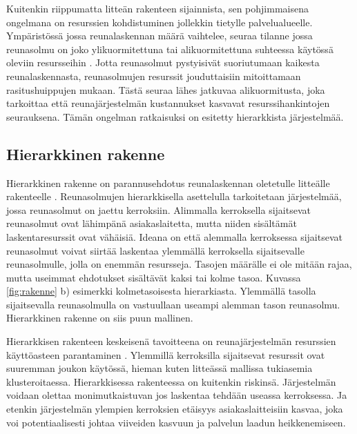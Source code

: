 Kuitenkin riippumatta litteän rakenteen sijainnista, sen pohjimmaisena ongelmana on resurssien kohdistuminen jollekkin tietylle palvelualueelle. Ympäristössä jossa reunalaskennan määrä vaihtelee, seuraa tilanne jossa reunasolmu on joko ylikuormitettuna tai alikuormitettuna suhteessa käytössä oleviin resursseihin \cite{tong2016hierarchical}. Jotta reunasolmut pystyisivät suoriutumaan kaikesta reunalaskennasta, reunasolmujen resurssit jouduttaisiin mitoittamaan rasitushuippujen mukaan. Tästä seuraa lähes jatkuvaa alikuormitusta, joka tarkoittaa että reunajärjestelmän kustannukset kasvavat resurssihankintojen seurauksena. 
Tämän ongelman ratkaisuksi on esitetty hierarkkista järjestelmää.




\subsection{Hierarkkinen rakenne}
Hierarkkinen rakenne on parannusehdotus reunalaskennan oletetulle litteälle rakenteelle \cite{tong2016hierarchical}.
Reunasolmujen hierarkkisella asettelulla tarkoitetaan järjestelmää, jossa reunasolmut on jaettu kerroksiin. Alimmalla kerroksella sijaitsevat reunasolmut ovat lähimpänä asiakaslaitetta, mutta niiden sisältämät laskentaresurssit ovat vähäisiä. 
Ideana on että alemmalla kerroksessa sijaitsevat reunasolmut voivat siirtää laskentaa ylemmällä kerroksella sijaitsevalle reunasolmulle, jolla on enemmän resursseja. Tasojen määrälle ei ole mitään rajaa, mutta useimmat ehdotukset sisältävät kaksi tai kolme tasoa. Kuvassa \ref{fig:rakenne} b) esimerkki kolmetasoisesta hierarkiasta.
Ylemmällä tasolla sijaitsevalla reunasolmulla on vastuullaan useampi alemman tason reunasolmu. Hierarkkinen rakenne on siis puun mallinen.

Hierarkkisen rakenteen keskeisenä tavoitteena on reunajärjestelmän resurssien käyttöasteen parantaminen \cite{tong2016hierarchical}. Ylemmillä kerroksilla sijaitsevat resurssit ovat suuremman joukon käytössä, hieman kuten litteässä mallissa tukiasemia klusteroitaessa. 
Hierarkkisessa rakenteessa on kuitenkin riskinsä. Järjestelmän voidaan olettaa monimutkaistuvan jos laskentaa tehdään useassa kerroksessa. Ja etenkin järjestelmän ylempien kerroksien etäisyys asiakaslaitteisiin kasvaa, joka voi potentiaalisesti johtaa viiveiden kasvuun ja palvelun laadun heikkenemiseen.

